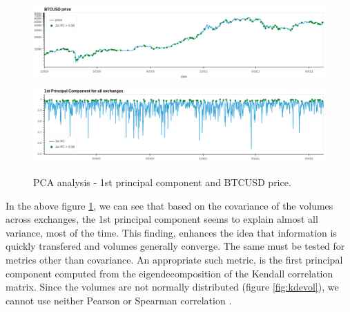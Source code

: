 \documentclass[10pt]{asme2ej}
\begin{document}
\begin{figure}[H]
	\centering
	\includegraphics[width=12cm, height = 3cm]{cov1.png} \\
	\includegraphics[width=12cm, height = 3cm]{cov2.png} \\
	\caption{PCA analysis - 1st principal component and BTCUSD price.}
	\label{fig:covmatrix}
\end{figure}

In the above figure \ref{fig:covmatrix}, we can see that based on the covariance of the volumes across exchanges, the 1st principal component seems to explain almost all variance, most of the time. This finding, enhances the idea that information is quickly transfered and volumes generally converge. The same must be tested for metrics other than covariance. An appropriate such metric, is the first principal component computed from the eigendecomposition of the Kendall correlation matrix. Since the volumes are not normally distributed (figure \ref{fig:kdevol}), we cannot use neither Pearson or Spearman correlation \cite{kendall}.
\end{document}
